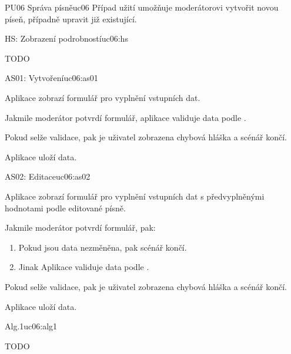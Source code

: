 \begin{usecase}{PU06 Správa písně}{uc06}
    Případ užití umožňuje moderátorovi vytvořit novou píseň, případně upravit již existující.

    \begin{scenario}{HS: Zobrazení podrobností}{uc06:hs}
        \item TODO
    \end{scenario}

    \begin{scenario}{AS01: Vytvoření}{uc06:as01}
        \item Aplikace zobrazí formulář pro vyplnění vstupních dat.
        \item Jakmile moderátor potvrdí formulář, aplikace validuje data podle .
        \item Pokud selže validace, pak je uživatel zobrazena chybová hláška a scénář končí.
        \item Aplikace uloží data.               
    \end{scenario}

    \begin{scenario}{AS02: Editace}{uc06:as02}
        \item Aplikace zobrazí formulář pro vyplnění vstupních dat s předvyplněnými hodnotami podle editované písně.
        \item Jakmile moderátor potvrdí formulář, pak:
        \begin{enumerate}
            \item Pokud jsou data nezměněna, pak scénář končí.
            \item Jinak Aplikace validuje data podle .
        \end{enumerate}
        \item Pokud selže validace, pak je uživatel zobrazena chybová hláška a scénář končí.
        \item Aplikace uloží data.
    \end{scenario}

    \begin{scenario}{Alg.1}{uc06:alg1}
        \item TODO
    \end{scenario}
\end{usecase}
